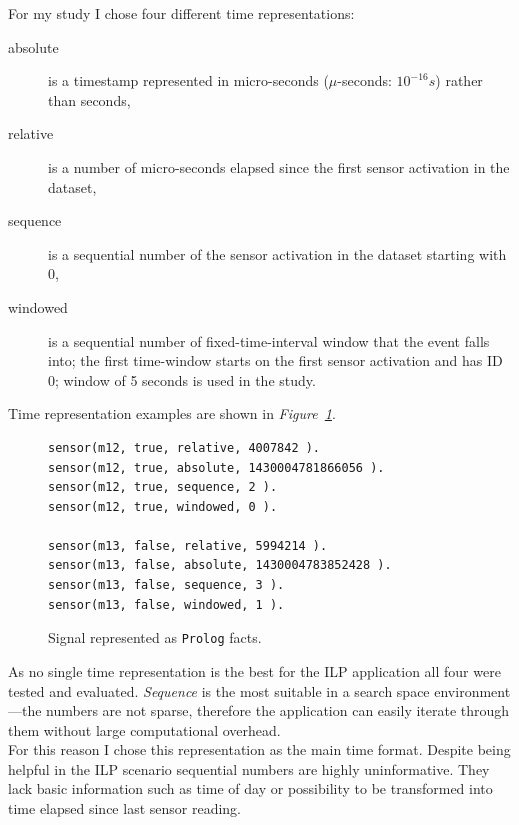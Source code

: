 \documentclass[10pt, a4paper, pdflatex, leqno, twoside, openright]{report}
\begin{document}
For my study I chose four different time representations:
\begin{description}
\item[absolute] is a timestamp represented in micro-seconds ($\mu$-seconds: $10^{-16}s$) rather than seconds,
\item[relative] is a number of micro-seconds elapsed since the first sensor activation in the dataset,
\item[sequence] is a sequential number of the sensor activation in the dataset starting with $0$,
\item[windowed] is a sequential number of fixed-time-interval window that the event falls into; the first time-window starts on the first sensor activation and has ID $0$; window of 5 seconds is used in the study.
\end{description}
Time representation examples are shown in \emph{Figure~\ref{lst:timerepresentation}}.\\

\begin{figure}[htb] %
  \begin{verbatim}
sensor(m12, true, relative, 4007842 ).
sensor(m12, true, absolute, 1430004781866056 ).
sensor(m12, true, sequence, 2 ).
sensor(m12, true, windowed, 0 ).

sensor(m13, false, relative, 5994214 ).
sensor(m13, false, absolute, 1430004783852428 ).
sensor(m13, false, sequence, 3 ).
sensor(m13, false, windowed, 1 ).
  \end{verbatim}
  \caption{Signal represented as \texttt{Prolog} facts.\label{lst:timerepresentation}}
\end{figure}

As no single time representation is the best for the ILP application all four were tested and evaluated. \emph{Sequence} is the most suitable in a search space environment---the numbers are not sparse, therefore the application can easily iterate through them without large computational overhead.\\
For this reason I chose this representation as the main time format. Despite being helpful in the ILP scenario sequential numbers are highly uninformative. They lack basic information such as time of day or possibility to be transformed into time elapsed since last sensor reading.\\
\end{document}
